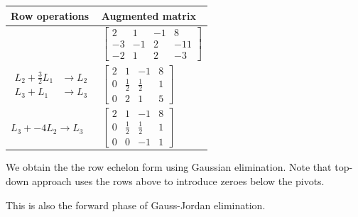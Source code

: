 \documentclass[../linear-algebra.tex]{subfiles}
\begin{document}
\begin{table}[H] %
\centering
\renewcommand{\arraystretch}{1.2} 

\begin{tabular}{|>{\centering\arraybackslash}m{4.5cm}|>{\centering\arraybackslash}m{6.5cm}|}
    \hline
    \textbf{Row operations} & \textbf{Augmented matrix} \\ \hline
    
    \rule{0pt}{2.5em} 
    & 
    $\left[
    \begin{array}{ccc|c}
         2 &  1 & -1 &   8 \\
        -3 & -1 &  2 & -11 \\
        -2 &  1 &  2 &  -3
    \end{array}
    \right]$ 
    \\[2em] \hline %
    
    \rule{0pt}{2.5em} 
    $\begin{aligned}
        L_2 + \tfrac{3}{2}L_1 &\rightarrow L_2 \\
        L_3 + L_1 &\rightarrow L_3
    \end{aligned}$ 
    & 
    $\left[
    \begin{array}{ccc|c}
        2 & 1 & -1 & 8 \\
        0 & \tfrac{1}{2} & \tfrac{1}{2} & 1 \\
        0 & 2 & 1 & 5
    \end{array}
    \right]$ 
    \\[2em] \hline
    
    \rule{0pt}{2.5em} 
    $L_3 + -4L_2 \rightarrow L_3$ 
    & 
    $\left[
    \begin{array}{ccc|c}
        2 & 1 & -1 & 8 \\
        0 & \frac{1}{2} & \frac{1}{2} & 1 \\
        0 & 0 & -1 & 1
    \end{array}
    \right]$ 
    \\[2em] \hline
\end{tabular}
\end{table}
\noindent We obtain the the row echelon form using Gaussian elimination.
Note that top-down approach uses the rows above to introduce zeroes below the pivots.

\noindent This is also the forward phase of Gauss-Jordan elimination.
\end{document}
